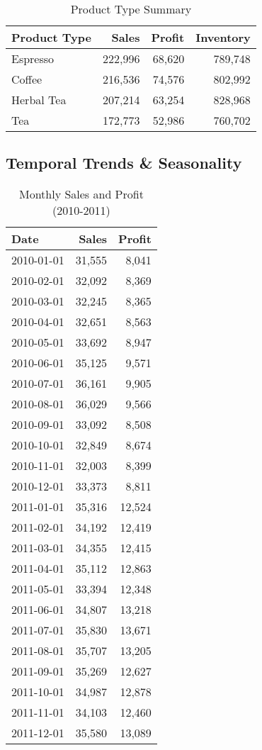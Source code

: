 \documentclass[11pt]{article}
\begin{document}
\begin{table}[H]
\centering
\caption{Product Type Summary}
\begin{tabular}{lrrr}
\toprule
Product Type & Sales & Profit & Inventory \\
\midrule
Espresso    & 222,996 & 68,620 & 789,748 \\
Coffee      & 216,536 & 74,576 & 802,992 \\
Herbal Tea  & 207,214 & 63,254 & 828,968 \\
Tea         & 172,773 & 52,986 & 760,702 \\
\bottomrule
\end{tabular}
\end{table}

\subsection{Temporal Trends \& Seasonality}
\begin{longtable}{lrr}
\caption{Monthly Sales and Profit (2010-2011)}\\
\toprule
Date & Sales & Profit \\
\midrule
2010-01-01 & 31,555 & 8,041 \\
2010-02-01 & 32,092 & 8,369 \\
2010-03-01 & 32,245 & 8,365 \\
2010-04-01 & 32,651 & 8,563 \\
2010-05-01 & 33,692 & 8,947 \\
2010-06-01 & 35,125 & 9,571 \\
2010-07-01 & 36,161 & 9,905 \\
2010-08-01 & 36,029 & 9,566 \\
2010-09-01 & 33,092 & 8,508 \\
2010-10-01 & 32,849 & 8,674 \\
2010-11-01 & 32,003 & 8,399 \\
2010-12-01 & 33,373 & 8,811 \\
2011-01-01 & 35,316 & 12,524 \\
2011-02-01 & 34,192 & 12,419 \\
2011-03-01 & 34,355 & 12,415 \\
2011-04-01 & 35,112 & 12,863 \\
2011-05-01 & 33,394 & 12,348 \\
2011-06-01 & 34,807 & 13,218 \\
2011-07-01 & 35,830 & 13,671 \\
2011-08-01 & 35,707 & 13,205 \\
2011-09-01 & 35,269 & 12,627 \\
2011-10-01 & 34,987 & 12,878 \\
2011-11-01 & 34,103 & 12,460 \\
2011-12-01 & 35,580 & 13,089 \\
\bottomrule
\end{longtable}
\end{document}
